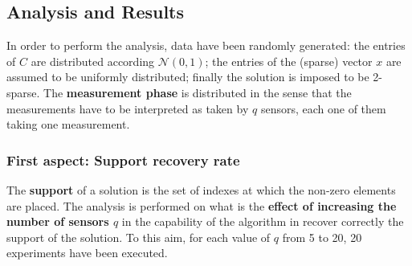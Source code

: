 \subsection*{Analysis and Results}
In order to perform the analysis, data have been randomly generated: the entries of $C$ are distributed according $\mathcal{N}(0,1)$;  the entries of the (sparse) vector $x$ are assumed to be uniformly distributed; finally the solution is imposed to be 2-sparse. The \textbf{measurement phase} is distributed in the sense that the measurements have to be interpreted as taken by $q$ sensors, each one of them taking one measurement.
\subsubsection*{First aspect: Support recovery rate}
The \textbf{support} of a solution is the set of indexes at which the non-zero elements are placed. The analysis is performed on what is the \textbf{effect of increasing the number of sensors $q$} in the capability of the algorithm in recover correctly the support of the solution. To this aim, for each value of $q$ from 5 to 20, 20 experiments have been executed.
